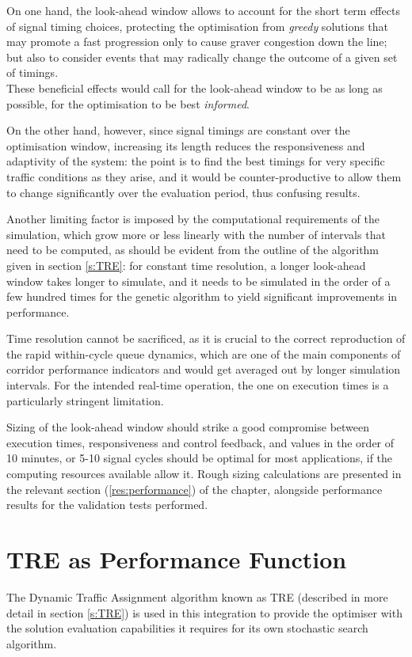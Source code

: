On one hand, the look-ahead window allows to account for the short term effects of signal timing choices, protecting the optimisation from \emph{greedy} solutions that may promote a fast progression only to cause graver congestion down the line; but also to consider events that may radically change the outcome of a given set of timings.\\
These beneficial effects would call for the look-ahead window to be as long as possible, for the optimisation to be best \emph{informed}.

On the other hand, however, since signal timings are constant over the optimisation window, increasing its length reduces the responsiveness and adaptivity of the system: the point is to find the best timings for very specific traffic conditions as they arise, and it would be counter-productive to allow them to change significantly over the evaluation period, thus confusing results.

Another limiting factor is imposed by the computational requirements of the simulation, which grow more or less linearly with the number of intervals that need to be computed, as should be evident from the outline of the algorithm given in section \ref{s:TRE}: for constant time resolution, a longer look-ahead window takes longer to simulate, and it needs to be simulated in the order of a few hundred times for the genetic algorithm to yield significant improvements in performance. 

Time resolution cannot be sacrificed, as it is crucial to the correct reproduction of the rapid within-cycle queue dynamics, which are one of the main components of corridor performance indicators and would get averaged out by longer simulation intervals. For the intended real-time operation, the one on execution times is a particularly stringent limitation.

Sizing of the look-ahead window should strike a good compromise between execution times, responsiveness and control feedback, and values in the order of 10 minutes, or 5-10 signal cycles should be optimal for most applications, if the computing resources available allow it.
Rough sizing calculations are presented in the relevant section (\ref{res:performance}) of the  chapter, alongside performance results for the validation tests performed.

\section{TRE as Performance Function} \label{s:rollingtre}
The Dynamic Traffic Assignment algorithm known as TRE (described in more detail in section \ref{s:TRE}) is used in this integration to provide the optimiser with the solution evaluation capabilities it requires for its own stochastic search algorithm.

